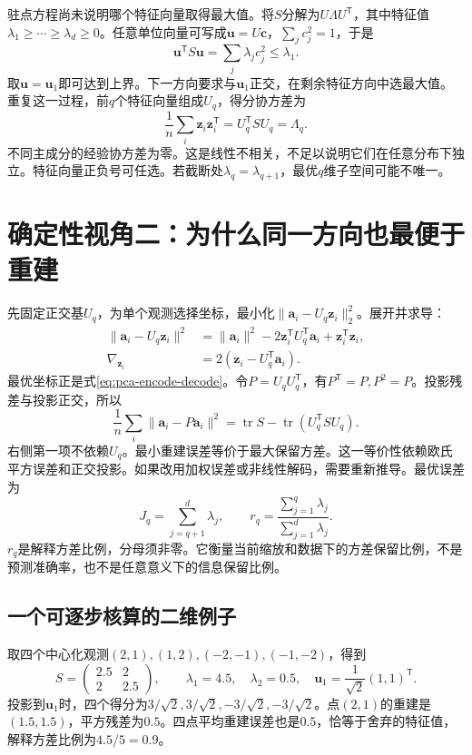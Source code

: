 驻点方程尚未说明哪个特征向量取得最大值。将$S$分解为$U\Lambda U^{\mathsf T}$，其中特征值$\lambda_1\ge\cdots\ge\lambda_d\ge0$。任意单位向量可写成$\bm u=U\bm c$，$\sum_jc_j^2=1$，于是
\begin{equation}
 \bm u^{\mathsf T}S\bm u=\sum_j\lambda_jc_j^2\le\lambda_1.
\end{equation}
取$\bm u=\bm u_1$即可达到上界。下一方向要求与$\bm u_1$正交，在剩余特征方向中选最大值。重复这一过程，前$q$个特征向量组成$U_q$，得分协方差为
\begin{equation}
 \frac1n\sum_i\bm z_i\bm z_i^{\mathsf T}=U_q^{\mathsf T}SU_q=\Lambda_q.
\end{equation}
不同主成分的经验协方差为零。这是线性不相关，不足以说明它们在任意分布下独立。特征向量正负号可任选。若截断处$\lambda_q=\lambda_{q+1}$，最优$q$维子空间可能不唯一。

\section{确定性视角二：为什么同一方向也最便于重建}
先固定正交基$U_q$，为单个观测选择坐标，最小化$\|\bm a_i-U_q\bm z_i\|_2^2$。展开并求导：
\begin{align}
 \|\bm a_i-U_q\bm z_i\|^2
 &=\|\bm a_i\|^2-2\bm z_i^{\mathsf T}U_q^{\mathsf T}\bm a_i+\bm z_i^{\mathsf T}\bm z_i,\\
 \nabla_{\bm z_i}&=2(\bm z_i-U_q^{\mathsf T}\bm a_i).
\end{align}
最优坐标正是式\eqref{eq:pca-encode-decode}。令$P=U_qU_q^{\mathsf T}$，有$P^{\mathsf T}=P,P^2=P$。投影残差与投影正交，所以
\begin{equation}
 \frac1n\sum_i\|\bm a_i-P\bm a_i\|^2
 =\operatorname{tr}S-\operatorname{tr}(U_q^{\mathsf T}SU_q).
 \label{eq:pca-reconstruction-objective}
\end{equation}
右侧第一项不依赖$U_q$。最小重建误差等价于最大保留方差。这一等价性依赖欧氏平方误差和正交投影。如果改用加权误差或非线性解码，需要重新推导。最优误差为
\begin{equation}
 J_q=\sum_{j=q+1}^d\lambda_j,
 \qquad r_q=\frac{\sum_{j=1}^q\lambda_j}{\sum_{j=1}^d\lambda_j}.
 \label{eq:pca-explained-variance}
\end{equation}
$r_q$是解释方差比例，分母须非零。它衡量当前缩放和数据下的方差保留比例，不是预测准确率，也不是任意意义下的信息保留比例。

\subsection{一个可逐步核算的二维例子}
取四个中心化观测$(2,1),(1,2),(-2,-1),(-1,-2)$，得到
\begin{equation}
 S=\begin{pmatrix}2.5&2\\2&2.5\end{pmatrix},\qquad
 \lambda_1=4.5,\quad\lambda_2=0.5,\quad
 \bm u_1=\frac1{\sqrt2}(1,1)^{\mathsf T}.
\end{equation}
投影到$\bm u_1$时，四个得分为$3/\sqrt2,3/\sqrt2,-3/\sqrt2,-3/\sqrt2$。点$(2,1)$的重建是$(1.5,1.5)$，平方残差为$0.5$。四点平均重建误差也是$0.5$，恰等于舍弃的特征值，解释方差比例为$4.5/5=0.9$。

